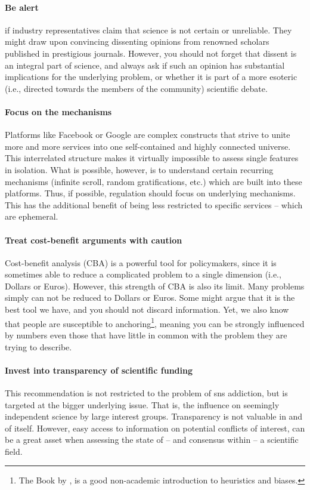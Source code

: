 \paragraph{Be alert} if industry representatives claim that science is not certain or unreliable. They might draw upon convincing dissenting opinions from renowned scholars published in prestigious journals. However, you should not forget that dissent is an integral part of science, and always ask if such an opinion has substantial implications for the underlying problem, or whether it is part of a more esoteric (i.e., directed towards the members of the community) scientific debate.

\paragraph{Focus on the mechanisms} Platforms like Facebook or Google are complex constructs that strive to unite more and more services into one self-contained and highly connected universe. 
This interrelated structure makes it virtually impossible to assess single features in isolation.
What is possible, however, is to understand certain recurring mechanisms (infinite scroll, random gratifications, etc.) which are built into these platforms. 
Thus, if possible, regulation should focus on underlying mechanisms.
This has the additional benefit of being less restricted to specific services -- which are ephemeral.

\paragraph{Treat cost-benefit arguments with caution} Cost-benefit analysis (CBA) is a powerful tool for policymakers, since it is sometimes able to reduce a complicated problem to a single dimension (i.e., Dollars or Euros).
However, this strength of CBA is also its limit.
Many problems simply can not be reduced to Dollars or Euros. 
Some might argue that it is the best tool we have, and you should not discard information. 
Yet, we also know that people are susceptible to anchoring\footnote{The Book by \citep{kahneman_thinking_2011}, is a good non-academic introduction to heuristics and biases.}, meaning you can be strongly influenced by numbers even those that have little in common with the problem they are trying to describe.

\paragraph{Invest into transparency of scientific funding} This recommendation is not restricted to the problem of \gls{sns} addiction, but is targeted at the bigger underlying issue. 
That is, the influence on seemingly independent science by large interest groups. 
Transparency is not valuable in and of itself.
However, easy access to information on potential conflicts of interest, can be a great asset when assessing the state of -- and consensus within -- a scientific field.


